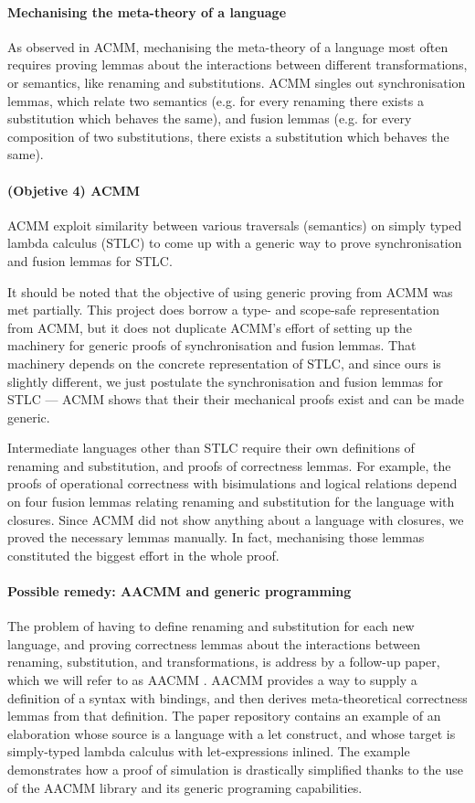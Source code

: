 \documentclass[bsc,frontabs,oneside,singlespacing,parskip,deptreport]{infthesis}
\theoremstyle{definition}
\theoremstyle{lemma}
\begin{document}
\paragraph{Mechanising the meta-theory of a language}
As observed in ACMM, mechanising the meta-theory of a language most
often requires proving lemmas about the interactions between different
transformations, or semantics, like renaming and substitutions. ACMM
singles out synchronisation lemmas, which relate two semantics
(e.g. for every renaming there exists a substitution which behaves the
same), and fusion lemmas (e.g. for every composition of two
substitutions, there exists a substitution which behaves the
same). 

\paragraph{(Objetive 4) ACMM}
ACMM exploit similarity between various traversals (semantics) on
simply typed lambda calculus (STLC) to come up with a generic way to
prove synchronisation and fusion lemmas for STLC.

It should be noted that the objective of using generic proving from
ACMM was met partially. This project does borrow a type- and
scope-safe representation from ACMM, but it does not duplicate ACMM's
effort of setting up the machinery for generic proofs of
synchronisation and fusion lemmas. That machinery depends on the
concrete representation of STLC, and since ours is slightly different,
we just postulate the synchronisation and fusion lemmas for STLC ---
ACMM shows that their their mechanical proofs exist and can be made
generic.

Intermediate languages other than STLC require their own definitions
of renaming and substitution, and proofs of correctness lemmas. For
example, the proofs of operational correctness with bisimulations and
logical relations depend on four fusion lemmas relating renaming and
substitution for the language with closures. Since ACMM did not show
anything about a language with closures, we proved the necessary
lemmas manually. In fact, mechanising those lemmas constituted the
biggest effort in the whole proof.

\paragraph{Possible remedy: AACMM and generic programming}
The problem of having to define renaming and substitution for each new
language, and proving correctness lemmas about the interactions
between renaming, substitution, and transformations, is address by a
follow-up paper, which we will refer to as AACMM
\cite{DBLP:journals/pacmpl/AllaisA0MM18}. AACMM provides a way to
supply a definition of a syntax with bindings, and then derives
meta-theoretical correctness lemmas from that definition. The paper
repository contains an example of an elaboration whose source is a
language with a let construct, and whose target is simply-typed lambda
calculus with let-expressions inlined. The example demonstrates how a
proof of simulation is drastically simplified thanks to the use of the
AACMM library and its generic programing capabilities.
\end{document}
